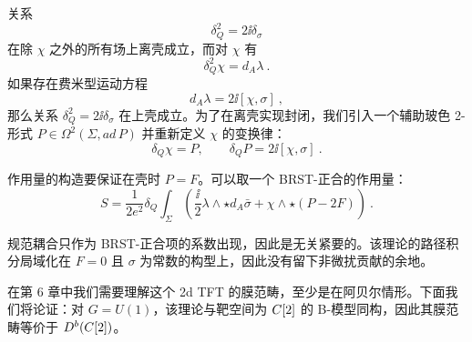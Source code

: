 关系
\[ \delta_Q^2 = 2\ii\delta_\sigma \]
在除 $\chi$ 之外的所有场上离壳成立，而对 $\chi$ 有
\[ \delta_Q^2\chi = d_A\lambda \ . \]
如果存在费米型运动方程
\[ d_A\lambda = 2\ii[\chi,\sigma] \ , \]
那么关系 $\delta_Q^2=2\ii\delta_\sigma$ 在上壳成立。为了在离壳实现封闭，我们引入一个辅助玻色 2-形式 $P\in\Omega^2(\Sigma,ad\,P)$ 并重新定义 $\chi$ 的变换律：
\[ \delta_Q\chi = P, \qquad \delta_QP = 2\ii[\chi,\sigma] \ . \]


作用量的构造要保证在壳时 $P=F$。可以取一个 BRST-正合的作用量：
\[ S = \frac{1}{2e^2}\delta_Q\int_\Sigma\left(\frac{\ii}{2}\lambda\wedge\star d_A\bar\sigma + \chi\wedge\star(P-2F)\right) \ . \]


规范耦合只作为 BRST-正合项的系数出现，因此是无关紧要的。该理论的路径积分局域化在 $F=0$ 且 $\sigma$ 为常数的构型上，因此没有留下非微扰贡献的余地。


在第 6 章中我们需要理解这个 2d TFT 的膜范畴，至少是在阿贝尔情形。下面我们将论证：对 $G=U(1)$，该理论与靶空间为 $C[2]$ 的 B-模型同构，因此其膜范畴等价于 $D^b(C[2])$。


